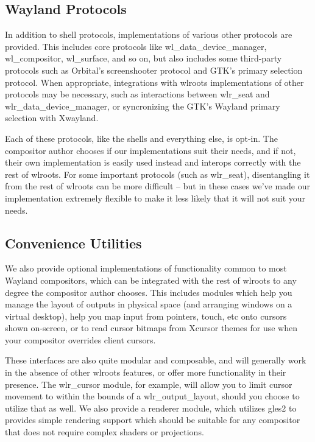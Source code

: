 \documentclass{article}
\begin{document}
\subsection{Wayland Protocols}

In addition to shell protocols, implementations of various other protocols are
provided. This includes core protocols like wl_data_device_manager,
wl_compositor, wl_surface, and so on, but also includes some third-party
protocols such as Orbital's screenshooter protocol and GTK's primary selection
protocol. When appropriate, integrations with wlroots implementations of other
protocols may be necessary, such as interactions between wlr_seat and
wlr_data_device_manager, or syncronizing the GTK's Wayland primary selection
with Xwayland.

Each of these protocols, like the shells and everything else, is opt-in. The
compositor author chooses if our implementations suit their needs, and if not,
their own implementation is easily used instead and interops correctly with the
rest of wlroots. For some important protocols (such as wlr_seat), disentangling
it from the rest of wlroots can be more difficult -- but in these cases we've
made our implementation extremely flexible to make it less likely that it will
not suit your needs.

\subsection{Convenience Utilities}

We also provide optional implementations of functionality common to most Wayland
compositors, which can be integrated with the rest of wlroots to any degree the
compositor author chooses. This includes modules which help you manage the
layout of outputs in physical space (and arranging windows on a virtual
desktop), help you map input from pointers, touch, etc onto cursors shown
on-screen, or to read cursor bitmaps from Xcursor themes for use when your
compositor overrides client cursors.

These interfaces are also quite modular and composable, and will generally work
in the absence of other wlroots features, or offer more functionality in their
presence. The wlr_cursor module, for example, will allow you to limit cursor
movement to within the bounds of a wlr_output_layout, should you choose to
utilize that as well. We also provide a renderer module, which utilizes gles2 to
provides simple rendering support which should be suitable for any compositor
that does not require complex shaders or projections.
\end{document}
